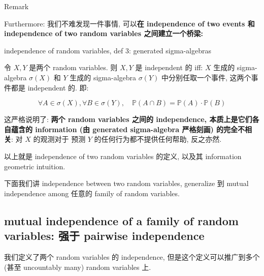 \documentclass{qlnotes-export}
\begin{document}
\begin{qlremark}{Remark}

Furthermore: 我们不难发现一件事情, 可以\textbf{在 independence of two events 和 independence of two random variables 之间建立一个桥梁:}

\begin{proposition}{independence of random variables, def 3: generated sigma-algebras}\label{prop-03-joint-conditional-distribution-independence-of-random-variables-def-3-generated-sigma-algebras}

令 \(X,Y\) 是两个 random variables. 则 \(X,Y\) 是 independent 的 iff: \(X\) 生成的 sigma-algebra \(\sigma(X)\) 和 \(Y\) 生成的 sigma-algebra \(\sigma(Y)\) 中分别任取一个事件, 这两个事件都是 independent 的. 即:

\[\forall A \in \sigma(X),\forall B \in \sigma(Y),\quad{\mathbb{P}}(A \cap B) = {\mathbb{P}}(A) \cdot {\mathbb{P}}(B)\]

\end{proposition}

这严格说明了: \textbf{两个 random variables 之间的 independence, 本质上是它们各自蕴含的 information (由 generated sigma-algebra 严格刻画) 的完全不相关}: 对 \(X\) 的观测对于 预测 \(Y\) 的任何行为都不提供任何帮助, 反之亦然.\\

\end{qlremark}

以上就是 independence of two random variables 的定义, 以及其 information geometric intuition.

下面我们讲 independence between two random variables, generalize 到 mutual independence among 任意的 family of random variables.

\subsection{mutual independence of a family of random variables: 强于 pairwise independence}\label{mutual-independence-of-a-family-of-random-variables-ux5f3aux4e8e-pairwise-independence}

我们定义了两个 random variables 的 independence, 但是这个定义可以推广到多个 (甚至 uncountably many) random variables 上.
\end{document}
